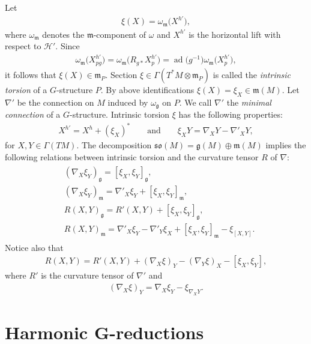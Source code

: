 \documentclass[10pt,a4paper]{amsart}
\numberwithin{equation}{section}
\begin{document}
Let
\begin{gather*}
\xi(X)=\omega_{\mathfrak{m}}\big(X^{h'}\big),
\end{gather*}
where $\omega_{\mathfrak{m}}$ denotes the $\mathfrak{m}$-component of $\omega$ and $X^{h'}$ is the horizontal lift with respect to $\mathcal{H}'$. Since
\begin{gather*}
\omega_{\mathfrak{m}}\big(X^{h'}_{pg}\big)=\omega_{\mathfrak{m}}\big(R_{g\ast}X^{h'}_p\big)
=\operatorname{ad}\big(g^{-1}\big)\omega_{\mathfrak{m}}\big(X^{h'}_p\big),
\end{gather*}
it follows that $\xi(X)\in \mathfrak{m}_P$. Section $\xi\in\Gamma(T^{\ast}M\otimes\mathfrak{m}_P)$ is called the {\it intrinsic torsion} of a $G$-structure $P$. By above identif\/ications $\xi(X)=\xi_X\in \mathfrak{m}(M)$. Let $\nabla '$ be the connection on $M$ induced by $\omega_{\mathfrak{g}}$ on $P$. We call $\nabla '$ the {\it minimal connection} of a $G$-structure. Intrinsic torsion $\xi$ has the following properties:
\begin{gather}\label{eq:intrinsictorsionproperties}
X^{h'}=X^h+(\xi_X)^{\ast}\qquad\textrm{and}\qquad \xi_XY=\nabla_XY-\nabla'_XY,
\end{gather}
for $X,Y\in \Gamma(TM)$. The decomposition $\mathfrak{so}(M)=\mathfrak{g}(M)\oplus\mathfrak{m}(M)$ implies the following relations between intrinsic torsion and the curvature tensor $R$ of $\nabla$:
\begin{gather}\label{eq:curvaturedecomp}
\begin{split}
&(\nabla_X\xi_Y)_{\mathfrak{g}}=[\xi_X,\xi_Y]_{\mathfrak{g}},\\
&(\nabla_X\xi_Y)_{\mathfrak{m}}=\nabla '_X\xi_Y+[\xi_X,\xi_Y]_{\mathfrak{m}},\\
&R(X,Y)_{\mathfrak{g}}=R'(X,Y)+[\xi_X,\xi_Y]_{\mathfrak{g}},\\
&R(X,Y)_{\mathfrak{m}}=\nabla '_X\xi_Y-\nabla '_Y\xi_X+[\xi_X,\xi_Y]_{\mathfrak{m}}-\xi_{[X,Y]}.
\end{split}
\end{gather}
Notice also that
\begin{gather}\label{eq:Rdecomp2}
R(X,Y)=R'(X,Y)+(\nabla_X\xi)_Y-(\nabla_Y\xi)_X-[\xi_X,\xi_Y],
\end{gather}
where $R'$ is the curvature tensor of $\nabla'$ and
\begin{gather*}
(\nabla_X\xi)_Y=\nabla_X\xi_Y-\xi_{\nabla_XY}.
\end{gather*}

\section[ Harmonic $G$-reductions]{Harmonic $\boldsymbol{G}$-reductions}\label{section3}
\end{document}
